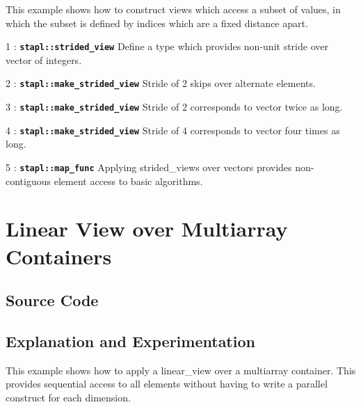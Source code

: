 \documentclass{report}
\begin{document}
This example shows how to construct views which access a subset of values,
in which the subset is defined by indices which are a fixed distance apart.

\begin{hashitemize}
\item 1 : \texttt{{\bf stapl::strided\_view}}
\newline
Define a type which provides non-unit stride over vector of integers.

\item 2 : \texttt{{\bf stapl::make\_strided\_view}}
\newline
Stride of 2 skips over alternate elements.

\item 3 : \texttt{{\bf stapl::make\_strided\_view}}
\newline
Stride of 2 corresponds to vector twice as long.

\item 4 : \texttt{{\bf stapl::make\_strided\_view}}
\newline
Stride of 4 corresponds to vector four times as long.

\item 5 : \texttt{{\bf stapl::map\_func}}
\newline
Applying strided\_views over vectors provides non-contiguous element access
to basic algorithms.

\end{hashitemize}


\pagebreak
\section{Linear View over Multiarray Containers}

\subsection{Source Code}



\subsection{Explanation and Experimentation}

This example shows how to apply a linear\_view over a multiarray container.
This provides sequential access to all elements without having
to write a parallel construct for each dimension.
\end{document}
